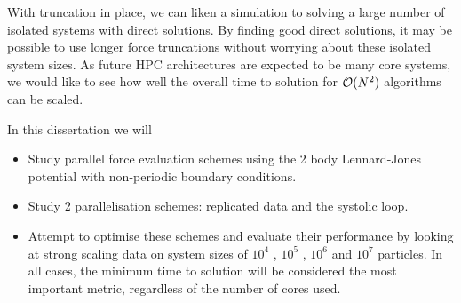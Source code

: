 %
With truncation in place, we can liken a simulation to solving a
large number of isolated systems with direct solutions.
%
By finding good direct solutions, it may be possible to use longer force
truncations without worrying about these isolated system sizes.
%
As future HPC architectures are expected to be many core systems,
we would like to see how well the overall time to solution for
$\mathcal{O}{(N^2)}$ algorithms can be scaled.


%
In this dissertation we will
\begin{itemize}
\item
    Study parallel force evaluation schemes using
    the 2 body Lennard-Jones potential with
    non-periodic boundary conditions.

\item
    Study 2 parallelisation schemes:
    replicated data and the systolic loop.

\item
    Attempt to optimise these schemes and
    evaluate their performance by looking at
    strong scaling data on system sizes of
    $10^4$ , $10^5$ , $10^6$ and $10^7$ particles.
    In all cases, the minimum time to solution will be
    considered the most important metric,
    regardless of the number of cores used.
\end  {itemize}
